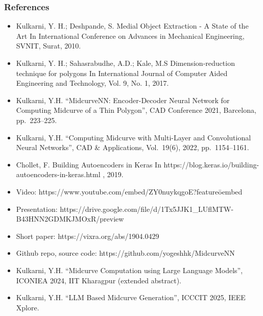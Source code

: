 \begin{frame}\frametitle{References}
\footnotesize
\begin{itemize}
\item Kulkarni, Y. H.; Deshpande, S. Medial Object Extraction - A State of the Art In International Conference on
Advances in Mechanical Engineering, SVNIT, Surat, 2010.
\item Kulkarni, Y. H.; Sahasrabudhe, A.D.; Kale, M.S Dimension-reduction technique for polygons In International
Journal of Computer Aided Engineering and Technology, Vol. 9, No. 1, 2017.
\item Kulkarni, Y.H. ``MidcurveNN: Encoder-Decoder Neural Network for Computing Midcurve of a Thin Polygon'', CAD Conference 2021, Barcelona, pp.~223--225.
\item Kulkarni, Y.H. ``Computing Midcurve with Multi-Layer and Convolutional Neural Networks'', CAD \& Applications, Vol.~19(6), 2022, pp.~1154--1161.
\item Chollet, F. Building Autoencoders in Keras In https://blog.keras.io/building-autoencoders-in-keras.html , 2019.
\item Video: https://www.youtube.com/embed/ZY0nuykqgoE?feature\=oembed
\item Presentation: https://drive.google.com/file/d/1Tx5JJK1\_LUflMTW-B43HNN2GDMKJMOxR/preview
\item Short paper:  https://vixra.org/abs/1904.0429
\item Github repo, source code: https://github.com/yogeshhk/MidcurveNN
\item Kulkarni, Y.H. ``Midcurve Computation using Large Language Models'', ICONIEA 2024, IIT Kharagpur (extended abstract).
\item Kulkarni, Y.H. ``LLM Based Midcurve Generation'', ICCCIT 2025, IEEE Xplore.
\end{itemize}
\end{frame}

